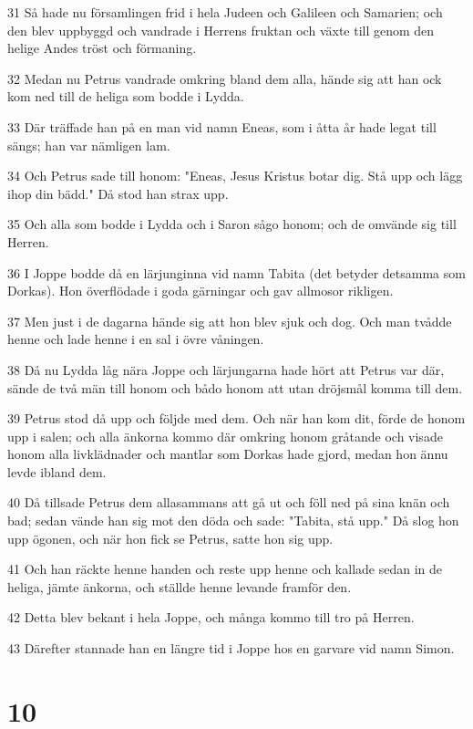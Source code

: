 \par 31 Så hade nu församlingen frid i hela Judeen och Galileen och Samarien; och den blev uppbyggd och vandrade i Herrens fruktan och växte till genom den helige Andes tröst och förmaning.
\par 32 Medan nu Petrus vandrade omkring bland dem alla, hände sig att han ock kom ned till de heliga som bodde i Lydda.
\par 33 Där träffade han på en man vid namn Eneas, som i åtta år hade legat till sängs; han var nämligen lam.
\par 34 Och Petrus sade till honom: "Eneas, Jesus Kristus botar dig. Stå upp och lägg ihop din bädd." Då stod han strax upp.
\par 35 Och alla som bodde i Lydda och i Saron sågo honom; och de omvände sig till Herren.
\par 36 I Joppe bodde då en lärjunginna vid namn Tabita (det betyder detsamma som Dorkas). Hon överflödade i goda gärningar och gav allmosor rikligen.
\par 37 Men just i de dagarna hände sig att hon blev sjuk och dog. Och man tvådde henne och lade henne i en sal i övre våningen.
\par 38 Då nu Lydda låg nära Joppe och lärjungarna hade hört att Petrus var där, sände de två män till honom och bådo honom att utan dröjsmål komma till dem.
\par 39 Petrus stod då upp och följde med dem. Och när han kom dit, förde de honom upp i salen; och alla änkorna kommo där omkring honom gråtande och visade honom alla livklädnader och mantlar som Dorkas hade gjord, medan hon ännu levde ibland dem.
\par 40 Då tillsade Petrus dem allasammans att gå ut och föll ned på sina knän och bad; sedan vände han sig mot den döda och sade: "Tabita, stå upp." Då slog hon upp ögonen, och när hon fick se Petrus, satte hon sig upp.
\par 41 Och han räckte henne handen och reste upp henne och kallade sedan in de heliga, jämte änkorna, och ställde henne levande framför den.
\par 42 Detta blev bekant i hela Joppe, och många kommo till tro på Herren.
\par 43 Därefter stannade han en längre tid i Joppe hos en garvare vid namn Simon.

\chapter{10}

